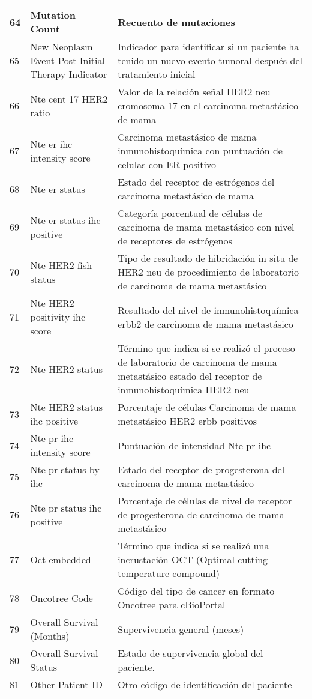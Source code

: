 \begin{table*} [!htb]
\begin{threeparttable}
\begin{tabular}{p{1cm} p{4cm} p{10cm}}
			\\ \hline	64	&	Mutation Count	&	Recuento de mutaciones
			\\ \hline	65	&	New Neoplasm Event Post Initial Therapy Indicator	&	Indicador para identificar si un paciente ha tenido un nuevo evento tumoral después del tratamiento inicial
			\\ \hline	66	&	Nte cent 17 HER2 ratio	&	Valor de la relación señal HER2 neu cromosoma 17 en el carcinoma metastásico de mama 
			\\ \hline	67	&	Nte er ihc intensity score	&	Carcinoma metastásico de mama inmunohistoquímica con puntuación de celulas con ER positivo
			\\ \hline	68	&	Nte er status	&	Estado del receptor de estrógenos del carcinoma metastásico de mama
			\\ \hline	69	&	Nte er status ihc positive	&	Categoría porcentual de células de carcinoma de mama metastásico con nivel de receptores de estrógenos
			\\ \hline	70	&	Nte HER2 fish status	&	Tipo de resultado de hibridación in situ de HER2 neu de procedimiento de laboratorio de carcinoma de mama metastásico
			\\ \hline	71	&	Nte HER2 positivity ihc score	&	Resultado del nivel de inmunohistoquímica erbb2 de carcinoma de mama metastásico
			\\ \hline	72	&	Nte HER2 status	&	Término que indica si se realizó el proceso de laboratorio de carcinoma de mama metastásico estado del receptor de inmunohistoquímica HER2 neu
			\\ \hline	73	&	Nte HER2 status ihc positive	&	Porcentaje de células Carcinoma de mama metastásico HER2 erbb positivos 
			\\ \hline	74	&	Nte pr ihc intensity score	&	Puntuación de intensidad Nte pr ihc
			\\ \hline	75	&	Nte pr status by ihc	&	Estado del receptor de progesterona del carcinoma de mama metastásico
			\\ \hline	76	&	Nte pr status ihc positive	&	Porcentaje de células de nivel de receptor de progesterona de carcinoma de mama metastásico
			\\ \hline	77	&	Oct embedded	&	Término que indica si se realizó una incrustación OCT (Optimal cutting temperature compound)
			\\ \hline	78	&	Oncotree Code	&	Código del tipo de cancer en formato Oncotree para cBioPortal
			\\ \hline	79	&	Overall Survival (Months)	&	Supervivencia general (meses)
			\\ \hline	80	&	Overall Survival Status	&	Estado de supervivencia global del paciente.
			\\ \hline	81	&	Other Patient ID	&	Otro código de identificación del paciente
			\\ \hline
		\end{tabular}
	\end{threeparttable}
\end{table*}

